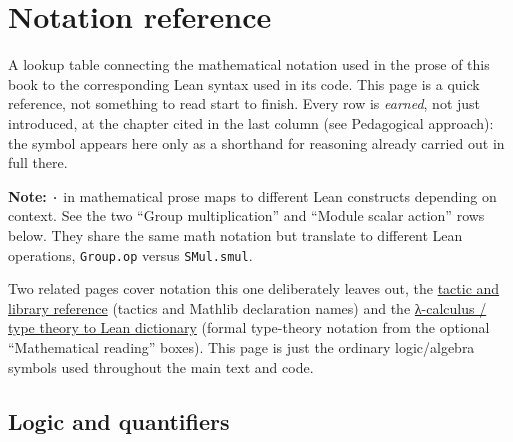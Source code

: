 \chapter*{Notation reference}
\setcounter{section}{0}\label{sec:root:notation-reference:1}

A lookup table connecting the mathematical notation used in the prose of this book to the corresponding Lean syntax used in its code. This page is a quick reference, not something to read start to finish. Every row is \emph{earned}, not just introduced, at the chapter cited in the last column (see Pedagogical approach): the symbol appears here only as a shorthand for reasoning already carried out in full there.

\textbf{Note:} \texttt{·} in mathematical prose maps to different Lean constructs depending on context. See the two ``Group multiplication'' and ``Module scalar action'' rows below. They share the same math notation but translate to different Lean operations, \texttt{Group.op} versus \texttt{SMul.smul}.

Two related pages cover notation this one deliberately leaves out, the \hyperref[sec:root:tactic-and-library-reference:1]{tactic and library reference} (tactics and Mathlib declaration names) and the \hyperref[sec:root:lambda-calculus-dictionary:1]{λ-calculus / type theory to Lean dictionary} (formal type-theory notation from the optional ``Mathematical reading'' boxes). This page is just the ordinary logic/algebra symbols used throughout the main text and code.

\section*{Logic and quantifiers}
\label{sec:root:notation-reference:2}


